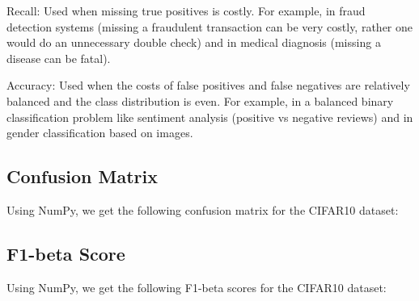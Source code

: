\documentclass[a4paper]{article}
\begin{document}
Recall: Used when missing true positives is costly. For example, in fraud detection systems (missing a fraudulent
transaction can be very costly, rather one would do an unnecessary double check) and in medical diagnosis (missing
a disease can be fatal).

Accuracy: Used when the costs of false positives and false negatives are relatively balanced and the class
distribution is even. For example, in a balanced binary classification problem like sentiment analysis
(positive vs negative reviews) and in gender classification based on images.
\bigskip

\subsection{Confusion Matrix}
Using NumPy, we get the following confusion matrix for the CIFAR10 dataset:

\bigskip

\subsection{F1-beta Score}
Using NumPy, we get the following F1-beta scores for the CIFAR10 dataset:
\end{document}
